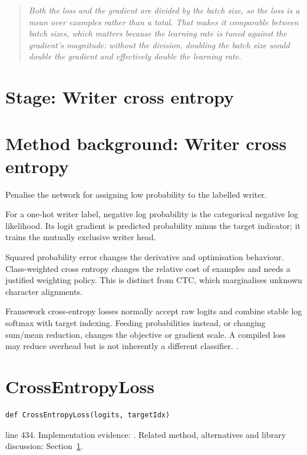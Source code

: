 \begin{quote}\small\itshape Both the loss and the gradient are divided by the batch size, so the loss is a mean over examples rather than a total. That makes it comparable between batch sizes, which matters because the learning rate is tuned against the gradient's magnitude: without the division, doubling the batch size would double the gradient and effectively double the learning rate.\end{quote}


\section*{Stage: Writer cross entropy}
\section{Method background: Writer cross entropy}\label{method:crossentropy}
Penalise the network for assigning low probability to the labelled writer.


For a one-hot writer label, negative log probability is the categorical negative log likelihood. Its logit gradient is predicted probability minus the target indicator; it trains the mutually exclusive writer head.


Squared probability error changes the derivative and optimisation behaviour. Class-weighted cross entropy changes the relative cost of examples and needs a justified weighting policy. This is distinct from CTC, which marginalises unknown character alignments.


Framework cross-entropy losses normally accept raw logits and combine stable log softmax with target indexing. Feeding probabilities instead, or changing sum/mean reduction, changes the objective or gradient scale. A compiled loss may reduce overhead but is not inherently a different classifier. \cite{gravesbook,code2026}.


\section{CrossEntropyLoss}\label{fn:train:CrossEntropyLoss}
\begin{lstlisting}[style=sig]
def CrossEntropyLoss(logits, targetIdx)
\end{lstlisting}
 line 434. Implementation evidence: \cite{code2026}. Related method, alternatives and library discussion: Section~\ref{method:crossentropy}.


